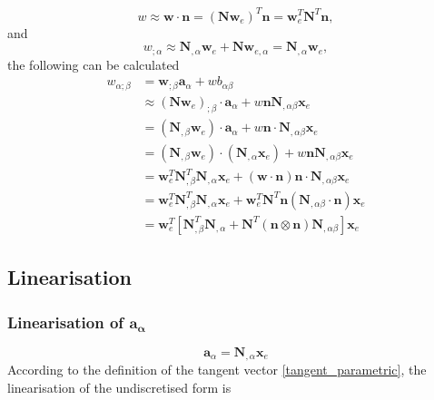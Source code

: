 \documentclass[../main.tex]{subfiles}
\begin{document}
\begin{appendices}
    \begin{equation}\label{eq:w_n}
        w \approx \boldsymbol{w} \cdot \boldsymbol{n} = \left( \mathbf{N} \mathbf{w}_{e} \right)^{T} \boldsymbol{n} = \mathbf{w}_{e}^{T} \mathbf{N}^{T} \boldsymbol{n},
    \end{equation}
and
    \begin{equation}\label{eq:w_cov}
    w_{; \alpha} \approx \mathbf{N}_{, \alpha} \mathbf{w}_{e} + \mathbf{N} \mathbf{w}_{e , \alpha} = \mathbf{N}_{, \alpha} \mathbf{w}_{e},
    \end{equation}
the following can be calculated
    \begin{equation}\label{eq:w_alp_cov}
        \begin{split}
            w_{\alpha; \beta} &= \boldsymbol{w}_{; \beta} \boldsymbol{a}_{\alpha} + w b_{\alpha \beta} \\ &\approx \left( \mathbf{N} \mathbf{w}_{e} \right)_{; \beta} \cdot \boldsymbol{a}_{\alpha} + w \boldsymbol{n} \mathbf{N}_{, \alpha \beta} \mathbf{x}_{e} \\ &= \left( \mathbf{N}_{, \beta} \mathbf{w}_{e} \right) \cdot \boldsymbol{a}_{\alpha} + w \boldsymbol{n} \cdot \mathbf{N}_{, \alpha \beta} \mathbf{x}_{e} \\ &= \left( \mathbf{N}_{, \beta} \mathbf{w}_{e} \right) \cdot \left( \mathbf{N}_{, \alpha} \mathbf{x}_{e} \right) + w \boldsymbol{n} \mathbf{N}_{, \alpha \beta} \mathbf{x}_{e} \\ &= \mathbf{w}_{e}^{T} \mathbf{N}_{, \beta}^{T} \mathbf{N}_{, \alpha} \mathbf{x}_{e} + \left( \boldsymbol{w} \cdot \boldsymbol{n} \right) \boldsymbol{n} \cdot \mathbf{N}_{, \alpha \beta} \mathbf{x}_{e} \\ &= \mathbf{w}_{e}^{T} \mathbf{N}_{, \beta}^{T} \mathbf{N}_{, \alpha} \mathbf{x}_{e} + \mathbf{w}_{e}^{T} \mathbf{N}^{T} \boldsymbol{n} \left( \mathbf{N}_{, \alpha \beta} \cdot \boldsymbol{n} \right) \mathbf{x}_{e} \\ &= \mathbf{w}_{e}^{T} \left[ \mathbf{N}_{, \beta}^{T} \mathbf{N}_{, \alpha} + \mathbf{N}^{T} \left( \boldsymbol{n} \otimes \boldsymbol{n} \right) \mathbf{N}_{, \alpha \beta} \right] \mathbf{x}_{e}
        \end{split}
    \end{equation}

\subsection{Linearisation} \label{appendices:curvy_linearisations}
\subsubsection{Linearisation of \texorpdfstring{$\boldsymbol{a_{\alpha}}$}{a-a}}
\begin{equation}\label{eq:a_a_lin}
    \boldsymbol{a}_{\alpha} = \mathbf{N}_{,\alpha} \mathbf{x}_{e}
\end{equation}
According to the definition of the tangent vector \eqref{tangent_parametric}, the linearisation of the undiscretised
 form is
    

\end{appendices}
\end{document}
